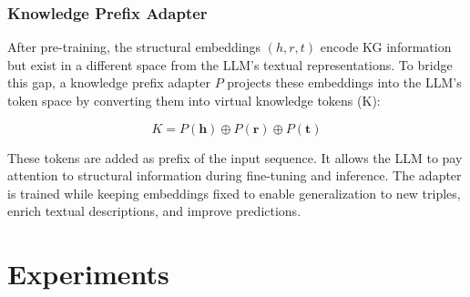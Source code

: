\documentclass[12pt,a4paper]{article}
\begin{document}
\subsubsection{Knowledge Prefix Adapter}
After pre-training, the structural embeddings \((h, r, t)\) encode
KG information but exist in a different space from the LLM's textual
representations. To bridge this gap, a knowledge prefix adapter \(P\)
projects these embeddings into the LLM's token space by converting
them into virtual knowledge tokens (K):

\begin{equation}
    K = P(\mathbf{h}) \oplus P(\mathbf{r}) \oplus P(\mathbf{t})
\end{equation}

These tokens are added as prefix of the input sequence. It allows
the LLM to pay attention to structural information during fine-tuning
and inference. The adapter is trained while keeping embeddings
fixed to enable generalization to new triples, enrich textual
descriptions, and improve predictions.
%
%

\section{Experiments}\label{sec:experiments}
\end{document}
